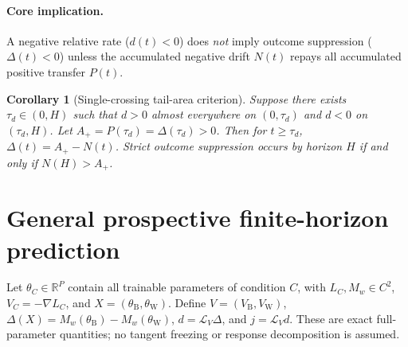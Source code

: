\documentclass{article}
\newtheorem{corollary}{Corollary}
\theoremstyle{definition}
\theoremstyle{remark}
\newcommand{\R}{\mathbb{R}}
\newcommand{\Bcond}{\mathrm{B}}
\newcommand{\Wcond}{\mathrm{W}}
\begin{document}
\paragraph{Core implication.}
A negative relative rate ($d(t) < 0$) does \emph{not} imply outcome suppression ($\Delta(t) < 0$) unless the accumulated negative drift $N(t)$ repays all accumulated positive transfer $P(t)$.

\begin{corollary}[Single-crossing tail-area criterion]
\label{cor:single-crossing}
Suppose there exists $\tau_d \in (0, H)$ such that $d > 0$ almost everywhere on $(0, \tau_d)$ and $d < 0$ on $(\tau_d, H)$. Let $A_+ = P(\tau_d) = \Delta(\tau_d) > 0$. Then for $t \ge \tau_d$, $\Delta(t) = A_+ - N(t)$. Strict outcome suppression occurs by horizon $H$ if and only if $N(H) > A_+$.
\end{corollary}

\section{General prospective finite-horizon prediction}
Let $\theta_C\in\R^P$ contain all trainable parameters of condition $C$, with $L_C,M_w\in C^2$, $V_C=-\nabla L_C$, and $X=(\theta_{\Bcond},\theta_{\Wcond})$. Define $V=(V_{\Bcond},V_{\Wcond})$, $\Delta(X)=M_w(\theta_{\Bcond})-M_w(\theta_{\Wcond})$, $d=\mathcal L_V\Delta$, and $j=\mathcal L_Vd$. These are exact full-parameter quantities; no tangent freezing or response decomposition is assumed.
\end{document}
